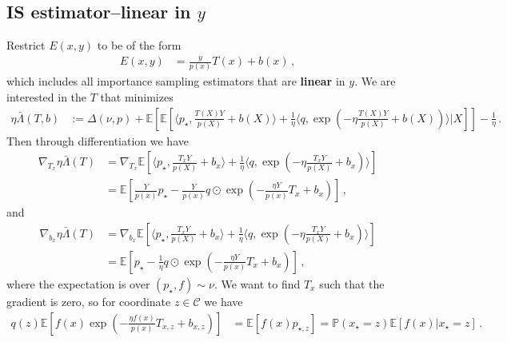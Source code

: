 \documentclass{article}
\theoremstyle{plain}
\theoremstyle{definition}
\theoremstyle{remark}
\newcommand{\E}{\mathbb E}
\newcommand{\PP}{\mathbb P}
\newcommand{\cC}{\mathcal C}
\theoremstyle{definition}
\begin{document}
\subsection{IS estimator--linear in $y$}
Restrict $E(x,y)$ to be of the form
\begin{align*}
    E(x,y) & = \frac{y}{p(x)} T(x) + b(x)\,,
\end{align*}
which includes all importance sampling estimators that are \textbf{linear} in $y$.
We are interested in the $T$ that minimizes
\begin{align*}
    \eta \bar \Lambda(T, b) & :=
    \Delta(\nu, p) +
    \E\!\left[
        \E\left[
            \langle p_\star, \tfrac{T(X) Y}{p(X)} + b(X)\rangle
            + \frac{1}{\eta}
            \langle q, \exp(- \eta \tfrac{T(X) Y}{p(X)} + b(X))\rangle
            \bigg| X
            \right]
        \right]
    - \frac{1}{\eta}\,.
\end{align*}
Then through differentiation we have
\begin{align*}
    \nabla_{T_x} \eta \bar{\Lambda}(T)
     & = \nabla_{T_x} \E\!\left[
        \langle p_\star, \tfrac{T_x Y}{p(X)} + b_x \rangle
        + \frac{1}{\eta}
        \langle q, \exp(- \eta \tfrac{T_x Y}{p(X)} + b_x)\rangle
        \right]
    \\
     & = \E\!\left[
        \tfrac{Y}{p(x)} p_\star
        - \tfrac{Y}{p(x)} q \odot \exp(- \tfrac{\eta Y}{p(x)} T_x + b_x)
        \right]\,,
\end{align*}
and
\begin{align*}
    \nabla_{b_x} \eta \bar{\Lambda}(T)
     & = \nabla_{b_x} \E\!\left[
        \langle p_\star, \tfrac{T_x Y}{p(X)} + b_x \rangle
        + \frac{1}{\eta}
        \langle q, \exp(- \eta \tfrac{T_x Y}{p(X)} + b_x)\rangle
        \right]
    \\
     & = \E\!\left[
        p_\star
        - \tfrac{1}{\eta} q \odot \exp(- \tfrac{\eta Y}{p(x)} T_x + b_x)
        \right]\,,
\end{align*}
where the expectation is over $(p_\star, f) \sim \nu$.
We want to find $T_x$ such that the gradient is zero, so for coordinate $z \in \cC$ we have
\begin{align*}
    q(z) \E\!\left[
        f(x)\exp(- \tfrac{\eta f(x)}{p(x)} T_{x,z} + b_{x,z})
        \right]
     & =
    \E\!\left[
        f(x) p_{\star, z}
        \right]
    =
    \PP(x_\star = z)
    \E\!\left[
        f(x)
        | x_\star = z
        \right]\,.
\end{align*}
\end{document}
